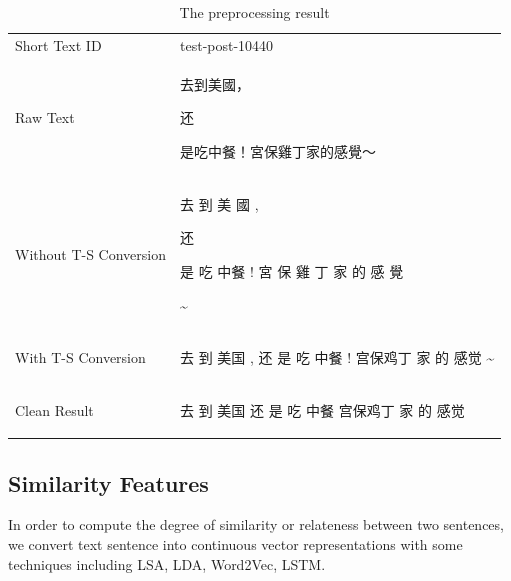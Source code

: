 \documentclass{sig-alternate}
\begin{document}
\begin{table}
\centering
\caption{The preprocessing result}
\begin{tabular}{l@{\qquad}l}
\hline\noalign{\smallskip}
Short Text ID & test-post-10440 \\
\noalign{\smallskip}
\hline
\noalign{\smallskip}
Raw Text          & \begin{CJK}{UTF8}{bsmi}去到美國，\begin{CJK}{UTF8}{gbsn}还\end{CJK}是吃中餐！宮保雞丁家的感覺～\end{CJK}  \\
\hline
\noalign{\smallskip}
Without T-S Conversion  & \begin{CJK}{UTF8}{bsmi}去 到 美 國 , \begin{CJK}{UTF8}{gbsn}还\end{CJK} 是 吃 中餐 ! 宮 保 雞 丁 家 的 感 覺 \end{CJK} \~{} \\
\hline
\noalign{\smallskip}
With T-S Conversion   & \begin{CJK}{UTF8}{gbsn}去 到 美国 , 还 是 吃 中餐 ! 宫保鸡丁 家 的 感觉 \~{}\end{CJK}   \\
\hline
\noalign{\smallskip}
Clean Result   & \begin{CJK}{UTF8}{gbsn}去 到 美国 还 是 吃 中餐 宫保鸡丁 家 的 感觉\end{CJK}   \\
\hline
\end{tabular}
\end{table}


\subsection{Similarity Features}
In order to compute the degree of similarity or relateness between two 
sentences, we convert text sentence into continuous vector representations 
with some techniques including LSA, LDA, Word2Vec, LSTM.
\end{document}
